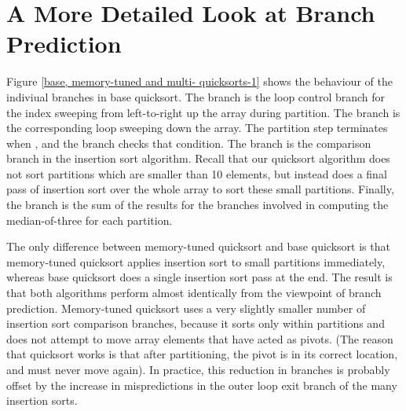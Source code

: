 \section{A More Detailed Look at Branch Prediction}





Figure \ref{base, memory-tuned and multi- quicksorts-1} shows the behaviour of
the indiviual branches in base quicksort. The  branch is the loop control
branch for the index sweeping from left-to-right up the array during partition.
The  branch is the corresponding loop sweeping down the array. The
partition step terminates when , and the  branch
checks that condition. The  branch is the comparison branch in the
insertion sort algorithm. Recall that our quicksort algorithm does not sort
partitions which are smaller than 10 elements, but instead does a final pass of
insertion sort over the whole array to sort these small partitions. Finally, the
 branch is the sum of the results for the branches involved in
computing the median-of-three for each partition.

The only difference between memory-tuned quicksort and base quicksort is that
memory-tuned quicksort applies insertion sort to small partitions immediately,
whereas base quicksort does a single insertion sort pass at the end. The result
is that both algorithms perform almost identically from the viewpoint of branch
prediction. Memory-tuned quicksort uses a very slightly smaller number of
insertion sort comparison branches, because it sorts only within partitions and
does not attempt to move array elements that have acted as pivots. (The reason
that quicksort works is that after partitioning, the pivot is in its correct
location, and must never move again). In practice, this reduction in branches is
probably offset by the increase in mispredictions in the outer loop exit branch
of the many insertion sorts.

